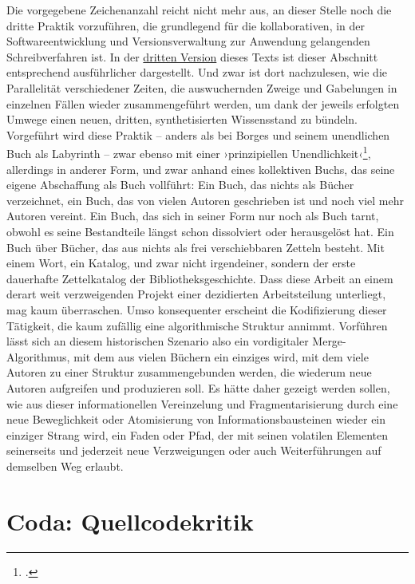 \documentclass[a4paper,11pt]{article}
\newcommand{\inanf}[1]{›#1‹}
\begin{document}
Die vorgegebene Zeichenanzahl reicht nicht mehr aus, an dieser Stelle noch die dritte Praktik vorzuführen, die grundlegend für die kollaborativen, in der Softwareentwicklung und Versionsverwaltung zur Anwendung gelangenden Schreibverfahren ist. In der \href{https://github.com/nachsommer/VersionsKontrolle/blob/master/3.Fassung/Assistenzsysteme.pdf}{dritten Version} dieses Texts ist dieser Abschnitt entsprechend ausführlicher dargestellt. Und zwar ist dort nachzulesen, wie die Parallelität verschiedener Zeiten, die auswuchernden Zweige und Gabelungen in einzelnen Fällen wieder zusammengeführt werden, um dank der jeweils erfolgten Umwege einen neuen, dritten, synthetisierten Wissensstand zu bündeln. Vorgeführt wird diese Praktik – anders als bei Borges und seinem unendlichen Buch als Labyrinth – zwar ebenso mit einer \inanf{prinzipiellen Unendlichkeit}\footcite[103]{hagen:2004}, allerdings in anderer Form, und zwar anhand eines kollektiven Buchs, das seine eigene Abschaffung als Buch vollführt: Ein Buch, das nichts als Bücher verzeichnet, ein Buch, das von vielen Autoren geschrieben ist und noch viel mehr Autoren vereint. Ein Buch, das sich in seiner Form nur noch als Buch tarnt, obwohl es seine Bestandteile längst schon dissolviert oder herausgelöst hat. Ein Buch über Bücher, das aus nichts als frei verschiebbaren Zetteln besteht. Mit einem Wort, ein Katalog, und zwar nicht irgendeiner, sondern der erste dauerhafte Zettelkatalog der Bibliotheksgeschichte. Dass diese Arbeit an einem derart weit verzweigenden Projekt einer dezidierten Arbeitsteilung unterliegt, mag kaum überraschen. Umso konsequenter erscheint die Kodifizierung dieser Tätigkeit, die kaum zufällig eine algorithmische Struktur annimmt. Vorführen lässt sich an diesem historischen Szenario also ein vordigitaler Merge-Algorithmus, mit dem aus vielen Büchern ein einziges wird, mit dem viele Autoren zu einer Struktur zusammengebunden werden, die wiederum neue Autoren aufgreifen und produzieren soll. Es hätte daher gezeigt werden sollen, wie aus dieser informationellen Vereinzelung und Fragmentarisierung durch eine neue Beweglichkeit oder Atomisierung von Informationsbausteinen wieder ein einziger Strang wird, ein Faden oder Pfad, der mit seinen volatilen Elementen seinerseits und jederzeit neue Verzweigungen oder auch Weiterführungen auf demselben Weg erlaubt.


\section*{Coda: Quellcodekritik}
\end{document}
